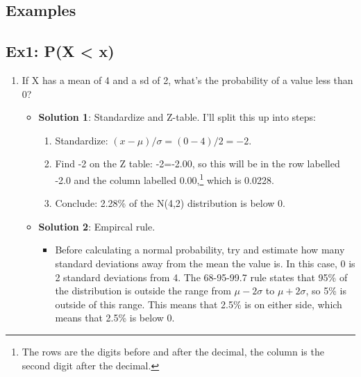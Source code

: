 \documentclass[
  letterpaper,
  DIV=11,
  numbers=noendperiod,
  oneside]{scrreprt}
\providecommand{\tightlist}{%
  \setlength{\itemsep}{0pt}\setlength{\parskip}{0pt}}\usepackage{longtable,booktabs,array}
\begin{document}
\hypertarget{examples-3}{%
\subsection{Examples}\label{examples-3}}

\hypertarget{ex1-px-x}{%
\subsection{Ex1: P(X \textless{} x)}\label{ex1-px-x}}

\begin{enumerate}
\def\labelenumi{\arabic{enumi}.}
\tightlist
\item
  If X has a mean of 4 and a sd of 2, what's the probability of a value
  less than 0?

  \begin{itemize}
  \tightlist
  \item
    \textbf{Solution 1}: Standardize and Z-table. I'll split this up
    into steps:

    \begin{enumerate}
    \def\labelenumii{\arabic{enumii}.}
    \tightlist
    \item
      Standardize: \((x-\mu)/\sigma = (0 - 4)/2 = -2\).
    \item
      Find -2 on the Z table: -2=-2.00, so this will be in the row
      labelled -2.0 and the column labelled 0.00,\footnote{The rows are
        the digits before and after the decimal, the column is the
        second digit after the decimal.} which is 0.0228.
    \item
      Conclude: 2.28\% of the N(4,2) distribution is below 0.
    \end{enumerate}
  \item
    \textbf{Solution 2}: Empircal rule.

    \begin{itemize}
    \tightlist
    \item
      Before calculating a normal probability, try and estimate how many
      standard deviations away from the mean the value is. In this case,
      0 is 2 standard deviations from 4. The 68-95-99.7 rule states that
      95\% of the distribution is outside the range from
      \(\mu - 2\sigma\) to \(\mu + 2\sigma\), so 5\% is outside of this
      range. This means that 2.5\% is on either side, which means that
      2.5\% is below 0.
    \end{itemize}
  \end{itemize}
\end{enumerate}
\end{document}

